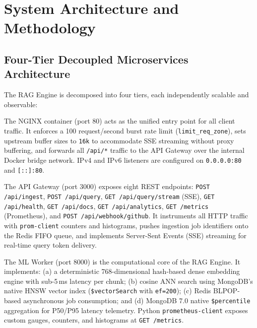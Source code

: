 \documentclass[12pt,a4paper]{report}
\begin{document}
\chapter{System Architecture and Methodology}

\section{Four-Tier Decoupled Microservices Architecture}

The RAG Engine is decomposed into four tiers, each independently scalable and
observable:

\begin{description}[leftmargin=2.5cm, style=nextline]
  \item[\textbf{Tier 1: NGINX Reverse-Proxy Layer}]
        The NGINX container (port 80) acts as the unified entry point for all
        client traffic. It enforces a 100 request/second burst rate limit
        (\texttt{limit\_req\_zone}), sets upstream buffer sizes to
        \texttt{16k} to accommodate SSE streaming without proxy buffering, and
        forwards all \texttt{/api/*} traffic to the API Gateway over the internal
        Docker bridge network. IPv4 and IPv6 listeners are configured on
        \texttt{0.0.0.0:80} and \texttt{[::]:80}.

  \item[\textbf{Tier 2: Node.js/Express API Gateway}]
        The API Gateway (port 3000) exposes eight REST endpoints:
        \texttt{POST /api/ingest}, \texttt{POST /api/query},
        \texttt{GET /api/query/stream} (SSE), \texttt{GET /api/health},
        \texttt{GET /api/docs}, \texttt{GET /api/analytics},
        \texttt{GET /metrics} (Prometheus), and
        \texttt{POST /api/webhook/github}. It instruments all HTTP traffic
        with \texttt{prom-client} counters and histograms, pushes ingestion
        job identifiers onto the Redis FIFO queue, and implements Server-Sent
        Events (SSE) streaming for real-time query token delivery.

  \item[\textbf{Tier 3: Python/FastAPI ML Worker}]
        The ML Worker (port 8000) is the computational core of the RAG Engine.
        It implements: (a) a deterministic 768-dimensional hash-based dense
        embedding engine with sub-5\,ms latency per chunk; (b) cosine ANN
        search using MongoDB's native HNSW vector index
        (\texttt{\$vectorSearch} with \texttt{ef=200}); (c) Redis BLPOP-based
        asynchronous job consumption; and (d) MongoDB 7.0 native
        \texttt{\$percentile} aggregation for P50/P95 latency telemetry.
        Python \texttt{prometheus-client} exposes custom gauges, counters,
        and histograms at \texttt{GET /metrics}.


\end{description}
\end{document}
